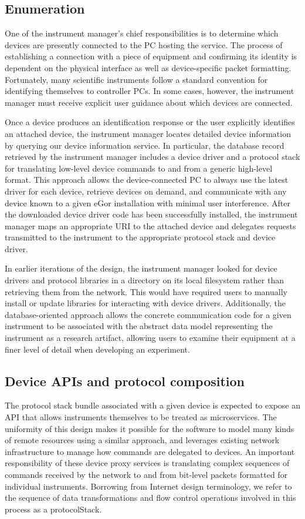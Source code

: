 \documentclass[../thesis]{subfiles}
\begin{document}
\subsection{Enumeration}
One of the instrument manager's chief responsibilities is to determine
which devices are presently connected to the PC hosting the
service. The process of establishing a connection with a piece of
equipment and confirming its identity is dependent on the physical
interface as well as device-specific packet formatting. Fortunately,
many scientific instruments follow a standard convention for
identifying themselves to controller PCs. In some cases, however, the
instrument manager must receive explicit user guidance about which
devices are connected.

Once a device produces an identification response or the user
explicitly identifies an attached device, the instrument manager
locates detailed device information by querying our device information
service. In particular, the database record retrieved by the
instrument manager includes a device driver and a protocol stack for
translating low-level device commands to and from a generic high-level
format. This approach allows the device-connected PC to always use the
latest driver for each device, retrieve devices on demand, and
communicate with any device known to a given eGor installation with
minimal user interference. After the downloaded device driver code has
been successfully installed, the instrument manager maps an
appropriate \gls{URI} to the attached device and delegates requests
transmitted to the instrument to the appropriate protocol stack and
device driver.

In earlier iterations of the design, the instrument manager looked for
device drivers and protocol libraries in a directory on its local
filesystem rather than retrieving them from the network. This would
have required users to manually install or update libraries for
interacting with device drivers. Additionally, the database-oriented
approach allows the concrete communication code for a given instrument
to be associated with the abstract data model representing the
instrument as a research artifact, allowing users to examine their
equipment at a finer level of detail when developing an experiment.

\subsection{Device APIs and protocol composition}
The protocol stack bundle associated with a given device is expected
to expose an \gls{API} that allows instruments themselves to be
treated as microservices. The uniformity of this design makes it
possible for the software to model many kinds of remote resources
using a similar approach, and leverages existing network
infrastructure to manage how commands are delegated to devices. An
important responsibility of these device proxy services is translating
complex sequences of commands received by the network to and from
bit-level packets formatted for individual instruments. Borrowing from
Internet design terminology, we refer to the sequence of data
transformations and flow control operations involved in this process
as a \gls{protocolStack}.
\end{document}
